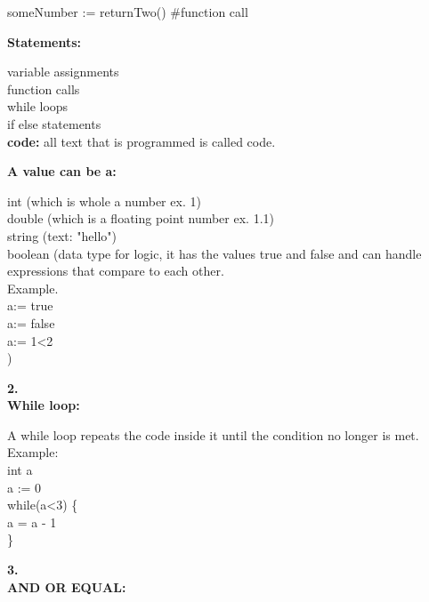 someNumber := returnTwo() \hspace*{2mm}  \#function call
\begin{flushleft}
\textbf{Statements:}
\end{flushleft}
  \hspace*{3mm} variable assignments\\
  \hspace*{3mm} function calls\\
  \hspace*{3mm} while loops\\
  \hspace*{3mm} if else statements\\
\textbf{code:} all text that is programmed is called code.\\
\begin{flushleft}
\textbf{A value can be a:}\\
\end{flushleft}
int (which is whole a number ex. 1)\\
double (which is a floating point number ex. 1.1)\\
string (text: "hello")\\
boolean (data type for logic, it has the values true and false and can handle expressions that compare to each other.\\
\hspace*{13mm} Example. \\
\hspace*{13mm} a:= true\\ 
\hspace*{13mm} a:= false\\
\hspace*{13mm} a:= 1<2\\
)
\begin{flushleft}
\textbf{2.}\\
\textbf{While loop:}
\end{flushleft}
A while loop repeats the code inside it until the condition no longer is met.\\
Example:\\
int a\\
a := 0\\
while(a<3) \{\\
\hspace*{2mm} a = a - 1\\
\}	
\begin{flushleft}
\textbf{3.}\\
\textbf{AND OR EQUAL:}
\end{flushleft}

